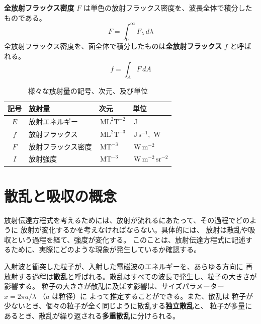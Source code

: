\documentclass[book]{dennou777}
\newcommand{\hmunit}[1]{\,\mathrm{#1}}
\newcommand{\hmemph}[1]{\textbf{#1}}
\begin{document}
\hmemph{全放射フラックス密度} \(F\) は単色の放射フラックス密度を、波長全体で積分したものである。
\begin{equation}
	F=\int^\infty_0 F_\lambda\,d\lambda
\end{equation}
全放射フラックス密度を、面全体で積分したものは\hmemph{全放射フラックス} \(f\) と呼ばれる。
\begin{equation}
	f=\int_AF\,dA
\end{equation}

\begin{table}[t]
	\caption{様々な放射量の記号、次元、及び単位}
	\centering
	\begin{tabular}{clll}
		\hline
		記号&放射量&次元&単位\\
		\hline\hline
		\(E\)&放射エネルギー&\(\hmunit{ML^2T^{-2}}\)&\(\hmunit{J}\)\\
		\(f\)&放射フラックス&\(\hmunit{ML^2T^{-3}}\)&\(\hmunit{J\,s^{-1}}\), \(\hmunit{W}\)\\
		\(F\)&放射フラックス密度&\(\hmunit{MT^{-3}}\)&\(\hmunit{W\,m^{-2}}\)\\
		\(I\)&放射強度&\(\hmunit{MT^{-3}}\)&\(\hmunit{W\,m^{-2}\,sr^{-2}}\)\\
		\hline
	\end{tabular}
\end{table}

\section{散乱と吸収の概念}
放射伝達方程式を考えるためには、放射が流れるにあたって、その過程でどのように
放射が変化するかを考えなければならない。具体的には、
放射は散乱や吸収という過程を経て、強度が変化する。
このことは、放射伝達方程式に記述するために、実際にどのような現象が発生しているか確認する。

入射波と衝突した粒子が、入射した電磁波のエネルギーを、あらゆる方向に
再放射する過程は\hmemph{散乱}と呼ばれる。散乱はすべての波長で発生し、粒子の大きさが影響する。
粒子の大きさが散乱に及ぼす影響は、サイズパラメーター \(x=2\pi a/\lambda\) （\(a\) は粒径）に
よって推定することができる。また、散乱は
粒子が少ないとき、個々の粒子が全く同じように散乱する\hmemph{独立散乱}と、
粒子が多量にあるとき、散乱が繰り返される\hmemph{多重散乱}に分けられる。
\end{document}
